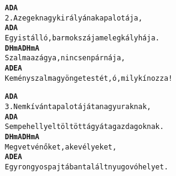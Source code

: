 \newpage
{}
\kottastart
{}
\kottaend
\begin{minipage}{\textwidth}
\begin{alltt}
\textbf{   A                       D        A}
2. Az egek nagy királyának a palotája,
\textbf{   A                          D           A}
   Egy istálló, barmok szája meleg kályhája.
\textbf{     D    Hm    A   D       Hm   A}
   Szalma az ágya, nincsen párnája,
\textbf{    A                           D        E    A}
   Kemény szalma gyönge testét, ó, mily kínozza!
\end{alltt}
\vspace{0.0cm}
\versszakspacing
\end{minipage}
\begin{minipage}{\textwidth}
\begin{alltt}
\textbf{   A                     D           A}
3. Nem kívánta palotáját a nagy uraknak,
\textbf{    A                          D          A}
   Sem pehellyel töltött ágyát a gazdagoknak.
\textbf{    D     Hm   A   D    Hm   A}
   Megvetvén őket, a kevélyeket,
\textbf{   A                             D   E    A}
   Egy rongyos pajtában talált nyugovóhelyet.
\end{alltt}
\vspace{0.0cm}
\versszakspacing
\end{minipage}
